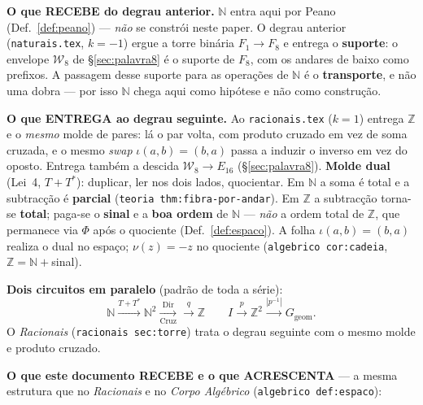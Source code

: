 \documentclass[11pt,a4paper]{article}
\newcommand{\code}[1]{\texttt{\small #1}}
\newcommand{\Word}{\mathcal{W}}
\begin{document}
\noindent\textbf{O que RECEBE do degrau anterior.} $\mathbb{N}$ entra aqui
por Peano (Def.~\ref{def:peano}) --- \emph{não} se constrói neste paper. O
degrau anterior (\code{naturais.tex}, $k=-1$) ergue a torre binária
$F_1\!\to\!F_8$ e entrega o \textbf{suporte}: o envelope $\Word_8$ de
§\ref{sec:palavra8} é o suporte de $F_8$, com os andares de baixo como
prefixos. A passagem desse suporte para as operações de $\mathbb{N}$ é o
\textbf{transporte}, e não uma dobra --- por isso $\mathbb{N}$ chega aqui como
hipótese e não como construção.

\medskip\noindent\textbf{O que ENTREGA ao degrau seguinte.} Ao
\code{racionais.tex} ($k=1$) entrega $\mathbb{Z}$ e o \emph{mesmo} molde de
pares: lá o par volta, com produto cruzado em vez de soma cruzada, e o mesmo
\emph{swap} $\iota(a,b)=(b,a)$ passa a induzir o inverso em vez do oposto.
Entrega também a descida $\Word_8\to E_{16}$ (§\ref{sec:palavra8}).
\textbf{Molde dual} (Lei~4, $T+T^{*}$): duplicar, ler nos dois lados,
quocientar. Em $\mathbb{N}$ a soma é total e a subtracção é \textbf{parcial}
(\code{teoria thm:fibra-por-andar}). Em $\mathbb{Z}$ a subtracção torna-se
\textbf{total}; paga-se o \textbf{sinal} e a \textbf{boa ordem} de $\mathbb{N}$
--- \emph{não} a ordem total de $\mathbb{Z}$, que permanece via
$\Phi$ após o quociente (Def.~\ref{def:espaco}). A folha $\iota(a,b)=(b,a)$ realiza o dual no
espaço; $\nu(z)=-z$ no quociente (\code{algebrico cor:cadeia},
$\mathbb{Z}=\mathbb{N}+{}$sinal).

\medskip\noindent\textbf{Dois circuitos em paralelo} (padrão de toda a série):
\[
\mathbb{N}\xrightarrow{T+T^{*}}\mathbb{N}^{2}
\xrightarrow[\mathrm{Cruz}]{\mathrm{Dir}}\xrightarrow{\,q\,}\mathbb{Z}
\qquad
I\xrightarrow{p}\mathbb{Z}^{2}\xrightarrow{|p^{-1}|}G_{\mathrm{geom}}.
\]
O \emph{Racionais} (\code{racionais sec:torre}) trata o degrau seguinte com o
mesmo molde e produto cruzado.

\medskip\noindent\textbf{O que este documento RECEBE e o que ACRESCENTA}
--- a mesma estrutura que no \emph{Racionais} e no \emph{Corpo Algébrico}
(\code{algebrico def:espaco}):
\end{document}
